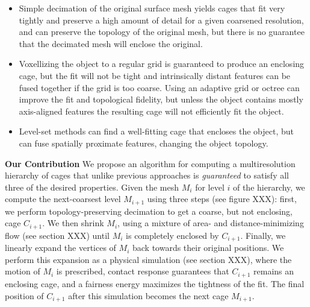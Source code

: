 \documentclass{acmtog}
\begin{document}
\begin{itemize}
\item Simple decimation of the original surface mesh yields cages that fit very tightly and preserve a high amount of detail for a given coarsened resolution, and can preserve the topology of the original mesh, but there is no guarantee that the decimated mesh will enclose the original.
\item Voxellizing the object to a regular grid is guaranteed to produce an enclosing cage, but the fit will not be tight and intrinsically distant features can be fused together if the grid is too coarse. Using an adaptive grid or octree can improve the fit and topological fidelity, but unless the object contains mostly axis-aligned features the resulting cage will not efficiently fit the object.
\item Level-set methods can find a well-fitting cage that encloses the object, but can fuse spatially proximate features, changing the object topology.
\end{itemize}

\noindent\textbf{Our Contribution} We propose an algorithm for computing a multiresolution hierarchy of cages that unlike previous approaches is \emph{guaranteed} to satisfy all three of the desired properties. Given the mesh $M_i$ for level $i$ of the hierarchy, we compute the next-coarsest level $M_{i+1}$ using three steps (see figure XXX): first, we perform topology-preserving decimation to get a coarse, but not enclosing, cage $C_{i+1}$. We then shrink $M_i$, using a mixture of area- and distance-minimizing flow (see section XXX) until $M_i$ is completely enclosed by $C_{i+1}$. Finally, we linearly expand the vertices of $M_i$ back towards their original positions. We perform this expansion as a physical simulation (see section XXX), where the motion of $M_i$ is prescribed, contact response guarantees that $C_{i+1}$ remains an enclosing cage, and a fairness energy maximizes the tightness of the fit. The final position of $C_{i+1}$ after this simulation becomes the next cage $M_{i+1}$.

\begin{acks}
\end{acks}





\end{document}
